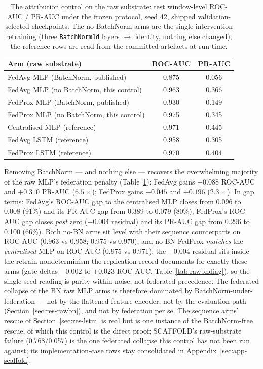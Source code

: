 \begin{table}[t]
\centering
\caption{The attribution control on the raw substrate: test
window-level ROC-AUC / PR-AUC under the frozen protocol, seed 42,
shipped validation-selected checkpoints. The no-BatchNorm arms are
the single-intervention retraining (three \texttt{BatchNorm1d}
layers $\to$ identity, nothing else changed); the reference rows are
read from the committed artefacts at run time.}
\label{tab:rawnobn}
\small
\begin{tabular}{@{}l c c@{}}
\toprule
\textbf{Arm (raw substrate)} & \textbf{ROC-AUC} & \textbf{PR-AUC} \\
\midrule
FedAvg MLP (BatchNorm, published) & 0.875 & 0.056 \\
FedAvg MLP (no BatchNorm, this control) & 0.963 & 0.366 \\
FedProx MLP (BatchNorm, published) & 0.930 & 0.149 \\
FedProx MLP (no BatchNorm, this control) & 0.975 & 0.345 \\
\midrule
Centralised MLP (reference) & 0.971 & 0.445 \\
FedAvg LSTM (reference) & 0.958 & 0.305 \\
FedProx LSTM (reference) & 0.970 & 0.404 \\
\bottomrule
\end{tabular}
\end{table}

Removing BatchNorm --- and nothing else --- recovers the overwhelming
majority of the raw MLP's federation penalty
(Table~\ref{tab:rawnobn}): FedAvg gains $+0.088$ ROC-AUC and
$+0.310$ PR-AUC ($6.5\times$); FedProx gains $+0.045$ and $+0.196$
($2.3\times$). In gap terms: FedAvg's ROC-AUC gap to the centralised
MLP closes from 0.096 to 0.008 (91\%) and its PR-AUC gap from 0.389
to 0.079 (80\%); FedProx's ROC-AUC gap closes \emph{past} zero
($-0.004$ residual) and its PR-AUC gap from 0.296 to 0.100 (66\%).
Both no-BN arms sit level with their sequence counterparts on
ROC-AUC (0.963 vs 0.958; 0.975 vs 0.970), and no-BN FedProx
\emph{matches} the \emph{centralised} MLP on ROC-AUC (0.975 vs
0.971): the $-0.004$ residual sits inside the retrain
nondeterminism the replication record documents for exactly these
arms (gate deltas $-0.002$ to $+0.023$ ROC-AUC,
Table~\ref{tab:rawbndiag}), so the single-seed reading is parity
within noise, not federated precedence. The federated
collapse of the BN raw MLP arms is therefore dominated by
BatchNorm-under-federation --- not by the flattened-feature encoder,
not by the evaluation path (Section~\ref{sec:res-rawbn}), and not by
federation per se. The sequence arms' rescue of
Section~\ref{sec:res-lstm} is real but is one instance of the
BatchNorm-free rescue, of which this control is the direct proof;
SCAFFOLD's raw-substrate failure (0.768/0.057) is the one federated
collapse this control has not been run against; its
implementation-case rows stay consolidated in
Appendix~\ref{sec:app-scaffold}.

